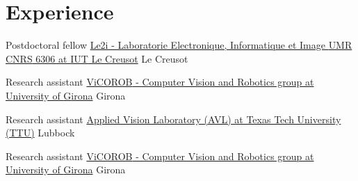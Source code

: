 
\section{Experience}

{Postdoctoral fellow}
{\href{http://le2i.cnrs.fr/?lang=en}{Le2i - Laboratorie Electronique, Informatique et Image {UMR CNRS} 6306 at {IUT} Le Creusot}}
{}
{Le Creusot}
{}

{Research assistant}
{\href{http://vicorob.udg.edu}{{ViCOROB} - Computer Vision and Robotics group at {U}niversity of {G}irona}}
{}
{Girona}
{}

{Research assistant}
{\href{http://www.depts.ttu.edu/ece/groups/appliedvision/}{Applied Vision Laboratory (AVL) at Texas Tech University (TTU)}}
{}
{Lubbock}
{}

{Research assistant}
{\href{http://vicorob.udg.edu}{{ViCOROB} - Computer Vision and Robotics group at {U}niversity of {G}irona}}
{}
{Girona}
{}


